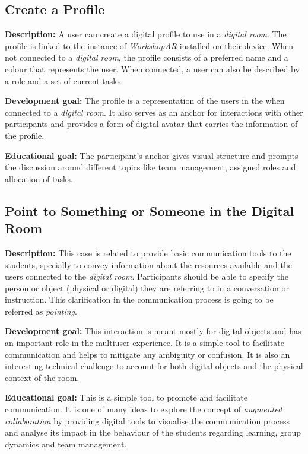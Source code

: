 \subsection{Create a Profile \label{sec:4-2-3}}

\textbf{Description:} A user can create a digital profile to use in a \emph{digital room}. The profile is linked to the instance of \emph{WorkshopAR} installed on their
device. When not connected to a \emph{digital room}, the profile consists of a preferred name and a colour that represents the user. When connected, a user can also be
described by a role and a set of current tasks.

\noindent
\textbf{Development goal:} The profile is a representation of the users in the when connected to a \emph{digital room}. It also serves as an anchor for interactions with
other participants and provides a form of digital avatar that carries the information of the profile.

\noindent
\textbf{Educational goal:} The participant's anchor gives visual structure and prompts the discussion around different topics like team management, assigned roles and
allocation of tasks.

\subsection{Point to Something or Someone in the Digital Room \label{sec:4-2-4}}

\textbf{Description:} This case is related to provide basic communication tools to the students, specially to convey information about the resources available and the
users connected to the \emph{digital room}. Participants should be able to specify the person or object (physical or digital) they are referring to in a conversation or
instruction. This clarification in the communication process is going to be referred as \emph{pointing}.

\noindent
\textbf{Development goal:} This interaction is meant mostly for digital objects and has an important role in the multiuser experience. It is a simple tool to facilitate
communication and helps to mitigate any ambiguity or confusion. It is also an interesting technical challenge to account for both digital objects and the physical context
of the room. 

\noindent
\textbf{Educational goal:} This is a simple tool to promote and facilitate communication. It is one of many ideas to explore the concept of \emph{augmented collaboration}
by providing digital tools to visualise the communication process and analyse its impact in the behaviour of the students regarding learning, group dynamics and team
management.

